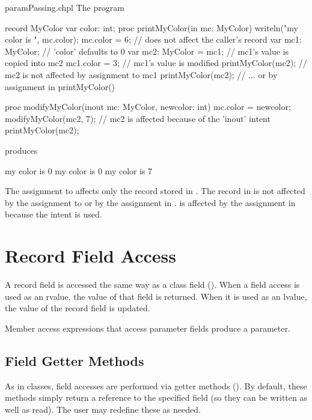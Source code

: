 \begin{chapelexample}{paramPassing.chpl}
The program
\begin{chapel}
record MyColor {
  var color: int;
}
proc printMyColor(in mc: MyColor) {
  writeln("my color is ", mc.color);
  mc.color = 6;   // does not affect the caller's record
}
var mc1: MyColor;        // 'color' defaults to 0
var mc2: MyColor = mc1;  // mc1's value is copied into mc2
mc1.color = 3;           // mc1's value is modified
printMyColor(mc2);       // mc2 is not affected by assignment to mc1
printMyColor(mc2);       // ... or by assignment in printMyColor()

proc modifyMyColor(inout mc: MyColor, newcolor: int) {
  mc.color = newcolor;
}
modifyMyColor(mc2, 7);   // mc2 is affected because of the 'inout' intent
printMyColor(mc2);
\end{chapel}
produces
\begin{chapelprintoutput}{}
my color is 0
my color is 0
my color is 7
\end{chapelprintoutput}
The assignment to  affects only the record stored
in . The record in  is not affected by
the assignment to  or by the assignment in .
 is affected by the assignment in 
because the intent  is used.
\end{chapelexample}

\section{Record Field Access}
\label{Record_Field_Access}

A record field is accessed the same way as a class field
().  When a field access is used as an
rvalue, the value of that field is returned.  When it is used as
an lvalue, the value of the record field is updated.

Member access expressions that access parameter fields
produce a parameter.

\subsection{Field Getter Methods}
\label{Field_Getter_Methods}

As in classes, field accesses are performed via getter methods
().  By default, these methods simply return a reference to
the specified field (so they can be written as well as read).  The user may
redefine these as needed.

